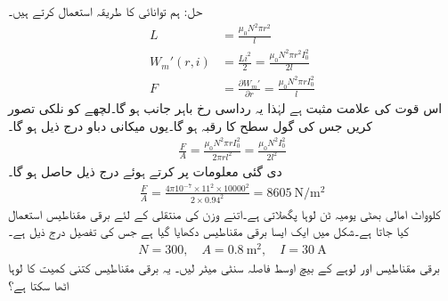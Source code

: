 حل:\quad 
ہم توانائی کا طریقہ استعمال کرتے ہیں۔
\begin{align*}
L&=\frac{\mu_0 N^2 \pi r^2}{l}\\
W_m'(r,i)&=\frac{L i^2}{2}=\frac{\mu_0 N^2 \pi r^2 I_0^2}{2 l}\\
F&=\frac{\partial W_m'}{\partial r}=\frac{\mu_0 N^2 \pi r I_0^2}{l}
\end{align*}
اس قوت کی علامت  مثبت ہے لہٰذا یہ رداسی رخ  باہر جانب ہو گا۔لچھے کو نلکی تصور کریں جس کی گول سطح  کا رقبہ  ہو گا۔یوں میکانی دباو درج ذیل ہو گا۔
\begin{align*}
\frac{F}{A}=\frac{\mu_0 N^2 \pi r I_0^2}{2\pi r l^2}=\frac{\mu_0 N^2  I_0^2}{2 l^2}
\end{align*}
دی گئی معلومات پر کرتے ہوئے درج ذیل  حاصل ہو گا۔
\begin{align*}
\frac{F}{A}=\frac{4\pi 10^{-7} \times 11^2 \times \num{10000}^2 }{2 \times 0.94^2}=\SI{8605}{\newton \per \meter \squared}
\end{align*}
%
   کلوواٹ امالی بھٹی یومیہ  ٹن لوہا  پگھلاتی ہے۔اتنے وزن کی منتقلی کے لئے برقی مقناطیس استعمال کیا جاتا ہے۔شکل  میں ایک ایسا  برقی مقناطیس دکھایا گیا ہے جس کی تفصیل درج ذیل ہے۔
\begin{align*}
N=300, \quad A=\SI{0.8}{\meter \squared}, \quad I=\SI{30}{\ampere}
\end{align*}
برقی مقناطیس اور لوہے کے بیچ اوسط فاصلہ  سنٹی میٹر لیں۔ یہ برقی مقناطیس کتنی کمیت کا لوہا اٹھا سکتا ہے؟

